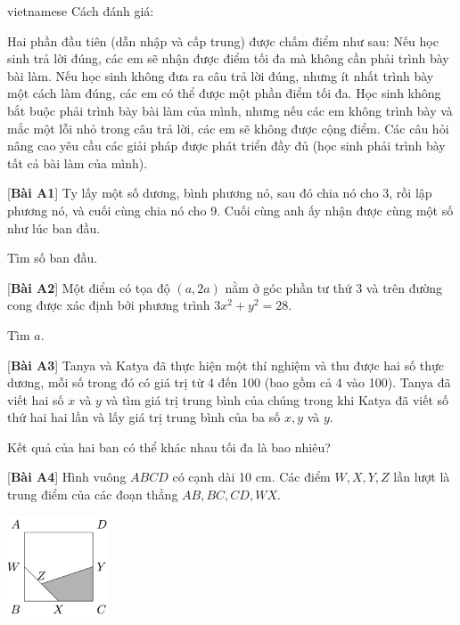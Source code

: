 \documentclass{article}
\begin{document}
\begin{otherlanguage*}{vietnamese}
Cách đánh giá:
\begin{itemize}[topsep=0pt, partopsep=0pt, itemsep=0pt]
    \ii Hai phần đầu tiên (dẫn nhập và cấp trung) được chấm điểm như sau:
    Nếu học sinh trả lời đúng, các em sẽ nhận được điểm tối đa mà không cần phải trình bày bài làm.
    Nếu học sinh không đưa ra câu trả lời đúng, nhưng ít nhất trình bày một cách làm đúng, các em có thể được một phần điểm tối đa.
    Học sinh không bắt buộc phải trình bày bài làm của mình, nhưng nếu các em không trình bày và mắc một lỗi nhỏ trong câu trả lời, các em sẽ không được cộng điểm.
    \ii Các câu hỏi nâng cao yêu cầu các giải pháp được phát triển đầy đủ (học sinh phải trình bày tất cả bài làm của mình).
\end{itemize}

\bigbreak
\begin{problem*}{[\textbf{Bài A1}]}
    Ty lấy một số dương, bình phương nó, sau đó chia nó cho 3, rồi lập phương nó, và cuối cùng chia nó cho 9. Cuối cùng anh ấy nhận được cùng một số như lúc ban đầu. 
    
    Tìm số ban đầu.
\end{problem*}

\begin{problem*}{[\textbf{Bài A2}]}
    Một điểm có tọa độ $(a,2a)$ nằm ở góc phần tư thứ 3 và trên đường cong được xác định bởi phương trình $3x^2 + y^2 = 28.$ 
    
    Tìm $a.$
\end{problem*}

\begin{problem*}{[\textbf{Bài A3}]}
    Tanya và Katya đã thực hiện một thí nghiệm và thu được hai số thực dương, mỗi số trong đó có giá trị từ 4 đến 100 (bao gồm cả 4 vào 100).
    Tanya đã viết hai số $x$ và $y$ và tìm giá trị trung bình của chúng 
    trong khi Katya đã viết số thứ hai hai lần và lấy giá trị trung bình của ba số $x, y$ và $y.$ 
    
    Kết quả của hai ban có thể khác nhau tối đa là bao nhiêu?
\end{problem*}

\begin{problem*}{[\textbf{Bài A4}]}
    Hình vuông $ABCD$ có cạnh dài 10 cm. Các điểm $W, X, Y, Z$ lần lượt là trung điểm của các đoạn thẳng $AB, BC, CD, WX.$
    \begin{center}
        \includegraphics[width=3cm]{./png/comc-2023-a4.png}
    \end{center}


\end{problem*}
\end{otherlanguage*}
\end{document}
